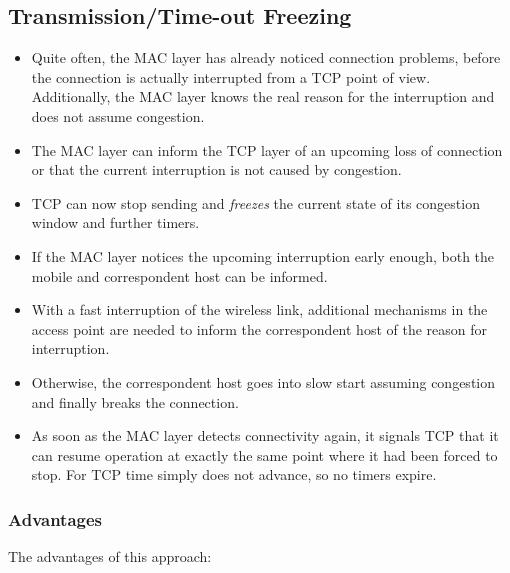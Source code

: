 \subsection{Transmission/Time-out Freezing}

\begin{itemize}
	\item Quite often, the MAC layer has already noticed connection problems, before the connection is actually interrupted from a TCP point of view.
	Additionally, the MAC layer knows the real reason for the interruption and does not assume congestion. 
	\item The MAC layer can inform the TCP layer of an upcoming loss of connection or that the current interruption is not caused by congestion. 
	\item TCP can now stop sending and \textit{freezes} the current state of its congestion window and further timers. 
	\item If the MAC layer notices the upcoming interruption early enough, both the mobile and correspondent host can be informed. 
	\item With a fast interruption of the wireless link, additional mechanisms in the access point are needed to inform the correspondent host of the reason for interruption. 
	\item Otherwise, the correspondent host goes into slow start assuming congestion and finally breaks the connection.
	\item As soon as the MAC layer detects connectivity again, it signals TCP that it can resume operation at exactly the same point where it had been forced to stop. For TCP time simply does not advance, so no timers expire.
\end{itemize}



\subsubsection{Advantages}
The advantages of this approach:
